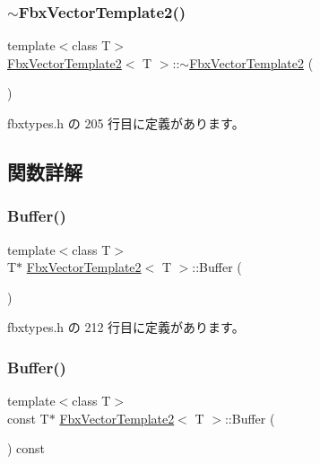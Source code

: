 \subsubsection{\texorpdfstring{$\sim$\+Fbx\+Vector\+Template2()}{~FbxVectorTemplate2()}}
{\footnotesize\ttfamily template$<$class T$>$ \\
\hyperlink{class_fbx_vector_template2}{Fbx\+Vector\+Template2}$<$ T $>$\+::$\sim$\hyperlink{class_fbx_vector_template2}{Fbx\+Vector\+Template2} (\begin{DoxyParamCaption}{ }\end{DoxyParamCaption})\hspace{0.3cm}{\ttfamily [inline]}}



 fbxtypes.\+h の 205 行目に定義があります。



\subsection{関数詳解}
\mbox{\label{class_fbx_vector_template2_a117a7f35111300b865b648e46b18dcdd}} 
\subsubsection{\texorpdfstring{Buffer()}{Buffer()}\hspace{0.1cm}{\footnotesize\ttfamily [1/2]}}
{\footnotesize\ttfamily template$<$class T$>$ \\
T$\ast$ \hyperlink{class_fbx_vector_template2}{Fbx\+Vector\+Template2}$<$ T $>$\+::Buffer (\begin{DoxyParamCaption}{ }\end{DoxyParamCaption})\hspace{0.3cm}{\ttfamily [inline]}}



 fbxtypes.\+h の 212 行目に定義があります。

\mbox{\label{class_fbx_vector_template2_a804f4c622838c2bbef16fb6878033741}} 
\subsubsection{\texorpdfstring{Buffer()}{Buffer()}\hspace{0.1cm}{\footnotesize\ttfamily [2/2]}}
{\footnotesize\ttfamily template$<$class T$>$ \\
const T$\ast$ \hyperlink{class_fbx_vector_template2}{Fbx\+Vector\+Template2}$<$ T $>$\+::Buffer (\begin{DoxyParamCaption}{ }\end{DoxyParamCaption}) const\hspace{0.3cm}{\ttfamily [inline]}}



